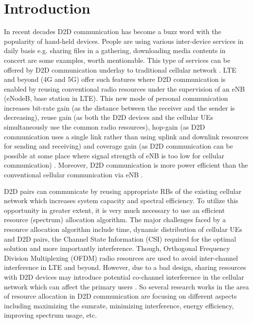\documentclass[times]{dacauth}
\begin{document}
\maketitle



\vspace{-6pt}

\section{Introduction}\label{section:Introduction}
\vspace {-0.1cm}
\noindent
In recent decades D2D communication has become a buzz word with the popularity of hand-held devices. People are using various inter-device services in daily basis e.g. sharing files in a gathering, downloading media contents in concert are some examples, worth mentionable. This type of services can be offered by D2D communication underlay to traditional cellular network \cite{doppler2009device}. LTE and beyond (4G and 5G) offer such features where D2D communication is enabled by reusing conventional radio resources under the supervision of an eNB (eNodeB, base station in LTE). This new mode of personal communication increases bit-rate gain (as the distance between the receiver and the sender is decreasing), reuse gain (as both the D2D devices and the cellular UEs simultaneously use the common radio resources), hop-gain (as D2D communication uses a single link rather than using uplink and downlink resources for sending and receiving) and coverage gain (as D2D communication can be possible at some place where signal strength of eNB is too low for cellular communication) \cite{fodor}. Moreover, D2D communication is more power efficient than the conventional cellular communication via eNB \cite{stefania}.
 
\smallskip
\noindent 
D2D pairs can communicate by reusing appropriate RBs of the existing cellular network which increases system capacity and spectral efficiency. To utilize this opportunity in greater extent, it is very much necessary to use an efficient resource (spectrum) allocation algorithm. The major challenges faced by a resource allocation algorithm include time, dynamic distribution of cellular UEs and D2D pairs, the Channel State Information (CSI) required for the optimal solution and more importantly interference. Though, Orthogonal Frequency Division Multiplexing (OFDM) radio resources are used to avoid inter-channel interference in LTE and beyond. However, due to a bad design, sharing resources with D2D devices may introduce potential co-channel interference in the cellular network which can affect the primary users  \cite{asadi2014survey, min}. So several research works in the area of resource allocation in D2D communication are focusing on different aspects including maximizing the sumrate, minimizing interference, energy efficiency, improving spectrum usage, etc.
\end{document}
